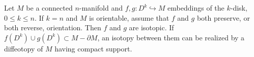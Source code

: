 Let $M$ be a connected $n$-manifold and $f, g: D^k \hookrightarrow M$ embeddings of the $k$-disk, $0 \leqslant k \leqslant n$. If $k = n$ and $M$ is orientable, assume that $f$ and $g$ both preserve, or both reverse, orientation. Then $f$ and $g$ are isotopic. If $f(D^k) \cup g(D^k) \subset M - \partial M$, an isotopy between them can be realized by a diffeotopy of $M$ having compact support.
